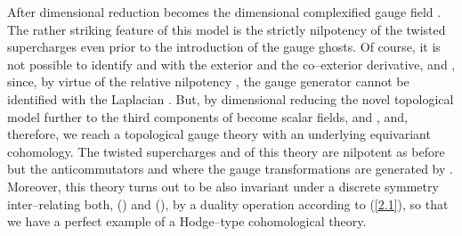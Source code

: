 \documentclass[a4paper,11pt]{article}
\begin{document}
After dimensional reduction \coordHE{} 
becomes the \coordHE{} dimensional complexified gauge field \coordHE{}. 
The rather striking feature of this model is the strictly nilpotency of 
the twisted supercharges \coordHE{} even prior to the introduction
of the gauge ghosts. Of course, it is not possible to identify \coordHE{} and
\coordHE{} with the exterior and the co--exterior derivative, \coordHE{} and
\myHighlight{$\delta$}\coordHE{}, since, by virtue of the relative nilpotency \coordHE{},
the gauge generator \coordHE{} cannot be identified with the Laplacian \myHighlight{$\Delta$}\coordHE{}. 
But, by dimensional reducing the \coordHE{} novel topological model further 
to \coordHE{} the third components of \coordHE{} become scalar fields, 
\coordHE{} and \coordHE{}, and, therefore, 
we reach a topological gauge theory with an underlying \coordHE{} equivariant 
cohomology. The twisted supercharges \coordHE{} and 
\coordHE{} of this theory are 
nilpotent as before but the anticommutators 
\coordHE{} and \coordHE{} 
where the gauge transformations \coordHE{} are
generated by \myHighlight{$\phi$}\coordHE{}. Moreover, this theory turns out to be also invariant 
under a discrete symmetry inter--relating both, 
(\coordHE{}) and (\coordHE{}), by a 
duality operation according to (\ref{2.1}), so that we have a perfect 
example of a Hodge--type cohomological theory. 
\end{document}
